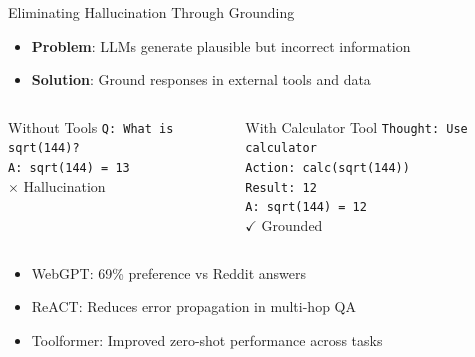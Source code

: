 \documentclass[aspectratio=169]{beamer}
\begin{document}
\begin{frame}{Eliminating Hallucination Through Grounding}
	\begin{itemize}
		\item {\color{highlight}\textbf{Problem}}: LLMs generate plausible but incorrect information
		\item {\color{highlight}\textbf{Solution}}: Ground responses in external tools and data
	\end{itemize}
	
	\begin{columns}
		\begin{block}{Without Tools}
			\small
			\texttt{Q: What is sqrt(144)?} \\
			\texttt{A: sqrt(144) = 13} \\
			{\color{red}$\times$ Hallucination}
		\end{block}
		
		\begin{block}{With Calculator Tool}
			\small
			\texttt{Thought: Use calculator} \\
			\texttt{Action: calc(sqrt(144))} \\
			\texttt{Result: 12} \\
			\texttt{A: sqrt(144) = 12} \\
			{\color{green}$\checkmark$ Grounded}
		\end{block}
	\end{columns}
	
	\vspace{0.5cm}
	\begin{itemize}
		\item WebGPT: 69\% preference vs Reddit answers
		\item ReACT: Reduces error propagation in multi-hop QA
		\item Toolformer: Improved zero-shot performance across tasks
	\end{itemize}
\end{frame}
\end{document}
